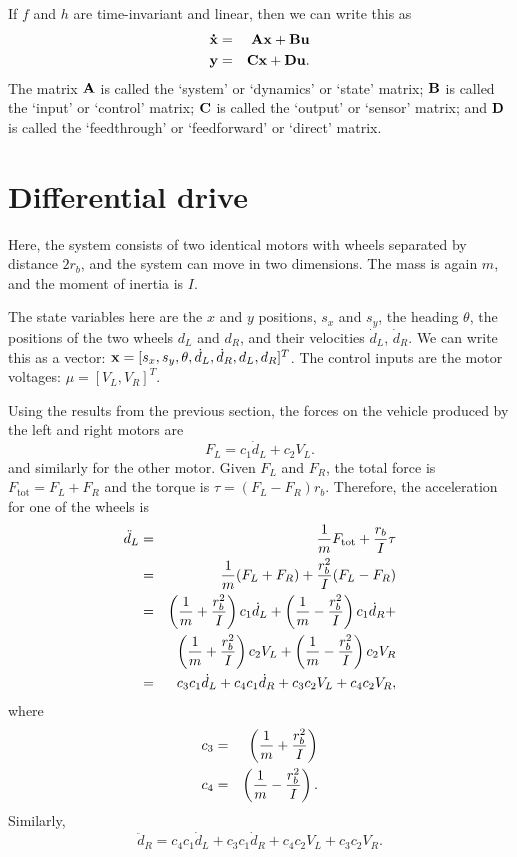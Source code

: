 \documentclass[12pt]{article}
\begin{document}
If $f$ and $h$ are time-invariant and linear, then we can write this as
\begin{eqnarray}
  {\bf\dot x} &=& {\bf A}{\bf x} + {\bf B}{\bf u} \\
  {\bf y} &=& {\bf C}{\bf x} + {\bf D}{\bf u}.
\end{eqnarray}
The matrix ${\bf A}$ is called the `system' or `dynamics' or `state' matrix;
${\bf B}$ is called the `input' or `control' matrix;
${\bf C}$ is called the `output' or `sensor' matrix; and
${\bf D}$ is called the `feedthrough' or `feedforward' or `direct' matrix.


\section{Differential drive}

Here, the system consists of two identical motors with wheels separated
by distance $2r_b$, and the system can move in two dimensions.
The mass is again $m$, and the moment of inertia is $I$.

The state variables here are the $x$ and $y$ positions, $s_x$ and $s_y$,
the heading $\theta$, the positions of the two wheels
$d_L$ and $d_R$, and their velocities $\dot d_L$, $\dot d_R$.
We can write this as a vector:
${\bf x} = [s_x, s_y, \theta, \dot d_L, \dot d_R, d_L, d_R]^T$.
The control inputs are the motor voltages: $\mu = [V_L, V_R]^T$.

Using the results from the previous section, the forces on the
vehicle produced by the left and right motors are
\begin{equation}
  F_L = c_1 \dot d_L + c_2 V_L.
\end{equation}
and similarly for the other motor.  Given $F_L$ and $F_R$,
the total force is $F_{\textrm{tot}} = F_L + F_R$ and the torque is
$\tau = (F_L -F_R) r_b$.  Therefore, the acceleration for one
of the wheels is
\begin{eqnarray}
  \ddot d_L &=& {1\over m}F_{\textrm{tot}} + {r_b\over I}\tau\\
            &=& {1\over m}(F_L + F_R) + {r_b^2\over I}(F_L - F_R)\\
            &=& \left({1\over m} + {r_b^2\over I}\right) c_1 \dot d_L +
                \left({1\over m} - {r_b^2\over I}\right) c_1 \dot d_R +\\
            & & \left({1\over m} + {r_b^2\over I}\right) c_2 V_L +
                \left({1\over m} - {r_b^2\over I}\right) c_2 V_R \nonumber\\
            &=& c_3 c_1 \dot d_L + c_4 c_1 \dot d_R + c_3 c_2 V_L + c_4 c_2 V_R ,
\end{eqnarray}
where
\begin{eqnarray}
  c_3 &=& \left({1\over m} + {r_b^2\over I}\right) \\
  c_4 &=& \left({1\over m} - {r_b^2\over I}\right).
\end{eqnarray}
Similarly,
\begin{equation}
  \ddot d_R = c_4 c_1 \dot d_L + c_3 c_1 \dot d_R + c_4 c_2 V_L + c_3 c_2 V_R.
\end{equation}
\end{document}
